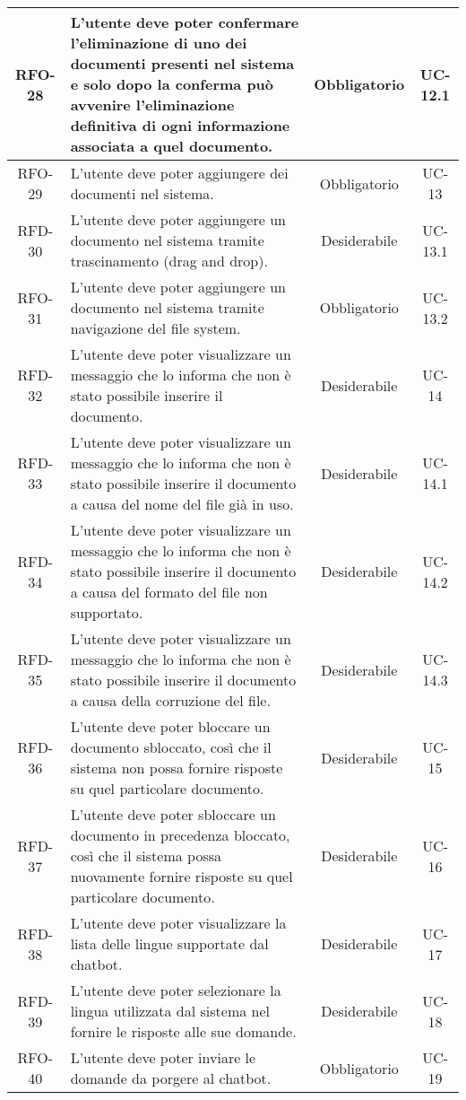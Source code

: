 \begin{xltabular}{\textwidth}{| c | X | c | c |}
    \hline
    RFO-28 & L’utente deve poter confermare l’eliminazione di uno dei documenti presenti nel sistema e solo dopo la conferma può avvenire l'eliminazione definitiva di ogni informazione associata a quel documento. & Obbligatorio & UC-12.1 \\
    \hline
    RFO-29 & L’utente deve poter aggiungere dei documenti nel sistema. & Obbligatorio & UC-13 \\
    \hline
    RFD-30 & L’utente deve poter aggiungere un documento nel sistema tramite trascinamento (drag and drop). & Desiderabile & UC-13.1 \\
    \hline
    RFO-31 & L’utente deve poter aggiungere un documento nel sistema tramite navigazione del file system. & Obbligatorio & UC-13.2 \\
    \hline
    RFD-32 & L'utente deve poter visualizzare un messaggio che lo informa che non è stato possibile inserire il documento. & Desiderabile  & UC-14 \\
    \hline
    RFD-33 & L'utente deve poter visualizzare un messaggio che lo informa che non è stato possibile inserire il documento a causa del nome del file già in uso. & Desiderabile & UC-14.1 \\
    \hline
    RFD-34 & L'utente deve poter visualizzare un messaggio che lo informa che non è stato possibile inserire il documento a causa del formato del file non supportato. & Desiderabile & UC-14.2 \\
    \hline
    RFD-35 & L'utente deve poter visualizzare un messaggio che lo informa che non è stato possibile inserire il documento a causa della corruzione del file. & Desiderabile & UC-14.3 \\
    \hline
    RFD-36 & L’utente deve poter bloccare un documento sbloccato, così che il sistema non possa fornire risposte su quel particolare documento. & Desiderabile & UC-15 \\
    \hline
    RFD-37 & L’utente deve poter sbloccare un documento in precedenza bloccato, così che il sistema possa nuovamente fornire risposte su quel particolare documento. & Desiderabile & UC-16 \\
    \hline
    RFD-38 & L’utente deve poter visualizzare la lista delle lingue supportate dal chatbot. & Desiderabile & UC-17 \\
    \hline
    RFD-39 & L’utente deve poter selezionare la lingua utilizzata dal sistema nel fornire le risposte alle sue domande. & Desiderabile & UC-18 \\
    \hline
    RFO-40 & L’utente deve poter inviare le domande da porgere al chatbot. & Obbligatorio & UC-19 \\

\end{xltabular}
